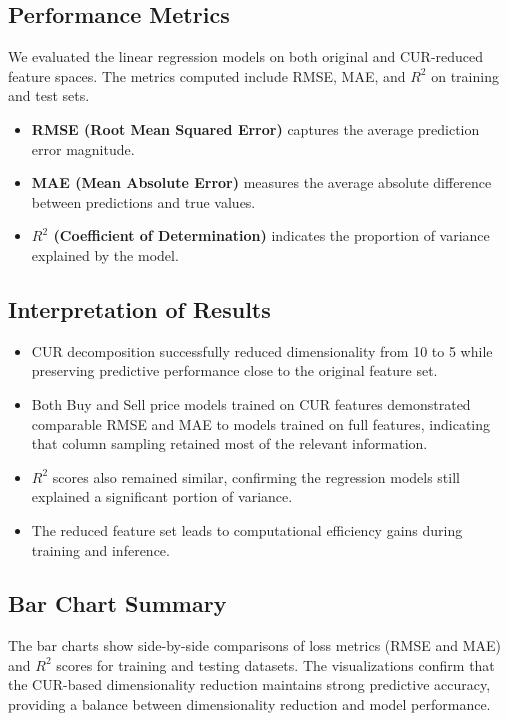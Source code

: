 \documentclass[a4paper,12pt]{article}
\begin{document}
\subsection{Performance Metrics}

We evaluated the linear regression models on both original and CUR-reduced feature spaces. The metrics computed include RMSE, MAE, and \( R^2 \) on training and test sets.

\begin{itemize}
    \item \textbf{RMSE (Root Mean Squared Error)} captures the average prediction error magnitude.
    \item \textbf{MAE (Mean Absolute Error)} measures the average absolute difference between predictions and true values.
    \item \textbf{\( R^2 \) (Coefficient of Determination)} indicates the proportion of variance explained by the model.
\end{itemize}

\subsection{Interpretation of Results}

\begin{itemize}
    \item CUR decomposition successfully reduced dimensionality from 10 to 5 while preserving predictive performance close to the original feature set.
    \item Both Buy and Sell price models trained on CUR features demonstrated comparable RMSE and MAE to models trained on full features, indicating that column sampling retained most of the relevant information.
    \item \( R^2 \) scores also remained similar, confirming the regression models still explained a significant portion of variance.
    \item The reduced feature set leads to computational efficiency gains during training and inference.
\end{itemize}

\subsection{Bar Chart Summary}

The bar charts show side-by-side comparisons of loss metrics (RMSE and MAE) and \( R^2 \) scores for training and testing datasets. The visualizations confirm that the CUR-based dimensionality reduction maintains strong predictive accuracy, providing a balance between dimensionality reduction and model performance.
\end{document}
